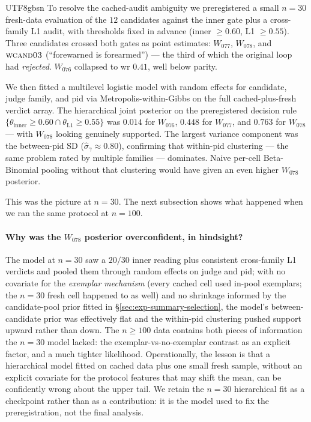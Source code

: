 \documentclass{article}
\begin{document}
\begin{CJK*}{UTF8}{gbsn}
To resolve the cached-audit ambiguity we preregistered a small
\(n=30\) fresh-data evaluation of the \(12\) candidates against
the inner gate plus a cross-family L1 audit, with thresholds
fixed in advance (inner \(\geq 0.60\), L1 \(\geq 0.55\)).
Three candidates crossed both gates as point estimates: \(W_{077}\),
\(W_{078}\), and \(\textsc{wcand03}\) (``forewarned is
forearmed'') --- the third of which the original loop had
\emph{rejected}. \(W_{076}\) collapsed to wr \(0.41\), well below
parity.

We then fitted a multilevel logistic model with random effects
for candidate, judge family, and pid via Metropolis-within-Gibbs
on the full cached-plus-fresh verdict array. The hierarchical
joint posterior on the preregistered decision rule
\(\{\theta_{\text{inner}} \geq 0.60 \cap \theta_{\text{L1}} \geq
0.55\}\) was \(0.014\) for \(W_{076}\), \(0.448\) for \(W_{077}\),
and \(0.763\) for \(W_{078}\) --- with \(W_{078}\) looking
genuinely supported. The largest variance component was the
between-pid SD (\(\hat\sigma_{\gamma} \approx 0.80\)), confirming
that within-pid clustering --- the same problem rated by multiple
families --- dominates. Naive per-cell Beta-Binomial pooling
without that clustering would have given an even higher
\(W_{078}\) posterior.

This was the picture at \(n=30\). The next subsection shows
what happened when we ran the same protocol at \(n=100\).

\paragraph{Why was the \(W_{078}\) posterior overconfident, in
hindsight?} The model at \(n=30\) saw a \(20/30\) inner reading
plus consistent cross-family L1 verdicts and pooled them through
random effects on judge and pid; with no covariate for the
\emph{exemplar mechanism} (every cached cell used in-pool
exemplars; the \(n=30\) fresh cell happened to as well) and no
shrinkage informed by the candidate-pool prior fitted in
\S\ref{sec:exp-summary-selection}, the model's between-candidate
prior was effectively flat and the within-pid clustering pushed
support upward rather than down. The \(n \geq 100\) data
contains both pieces of information the \(n=30\) model lacked:
the exemplar-vs-no-exemplar contrast as an explicit factor, and a
much tighter likelihood. Operationally, the lesson is that a
hierarchical model fitted on cached data plus one small fresh
sample, without an explicit covariate for the protocol features
that may shift the mean, can be confidently wrong about the upper
tail. We retain the \(n=30\) hierarchical fit as a checkpoint
rather than as a contribution: it is the model used to fix the
preregistration, not the final analysis.


\end{CJK*}
\end{document}
